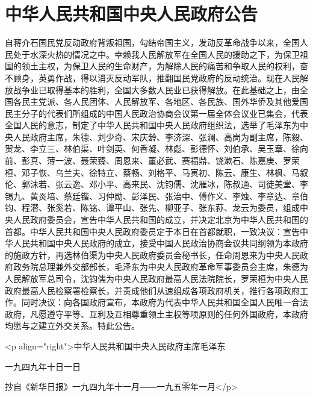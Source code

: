 \section[中华人民共和国中央人民政府公告（一九四九年十月一日）]{中华人民共和国中央人民政府公告}


自蒋介石国民党反动政府背叛祖国，勾结帝国主义，发动反革命战争以来，全国人民处于水深火热的情况之中。幸赖我人民解放军在全国人民的援助之下，为保卫祖国的领土主权，为保卫人民的生命财产，为解除人民的痛苦和争取人民的权利，奋不顾身，英勇作战，得以消灭反动军队，推翻国民党政府的反动统治。现在人民解放战争业已取得基本的胜利，全国大多数人民业已获得解放。在此基础之上，由全国各民主党派、各人民团体、人民解放军、各地区、各民族、国外华侨及其他爱国民主分子的代表们所组成的中国人民政治协商会议第一届全体会议业已集会，代表全国人民的意志，制定了中华人民共和国中央人民政府组织法，选举了毛泽东为中央人民政府主席，朱德、刘少奇、宋庆龄、李济深、张澜、高岗为副主席，陈毅、贺龙、李立三、林伯渠、叶剑英、何香凝、林彪、彭德怀、刘伯承、吴玉章、徐向前、彭真、薄一波、聂荣臻、周恩来、董必武、赛福鼎、饶漱石、陈嘉庚、罗荣桓、邓子恢、乌兰夫、徐特立、蔡畅、刘格平、马寅初、陈云、康生、林枫、马叙伦、郭沬若、张云逸、邓小平、高来民、沈钧儒、沈雁冰，陈叔通、司徒美堂、李锡九、黄炎培、蔡廷锴、习仲勋、彭泽民、张治中、傅作义、李烛、李章达、章伯钧、程潜、张奚若、陈铭、谭平山、张先、柳亚子、张东荪、龙云为委员，组成中央人民政府委员会，宣告中华人民共和国的成立，并决定北京为中华人民共和国的首都。中华人民共和国中央人民政府委员定于本日在首都就职，一致决议：宣告中华人民共和国中央人民政府的成立，接受中国人民政治协商会议共同纲领为本政府的施政方针，再选林伯渠为中央人民政府委员会秘书长，任命周恩来为中央人民政府政务院总理兼外交部部长，毛泽东为中央人民政府革命军事委员会主席，朱德为人民解放军总司令，沈钧儒为中央人民政府最高人民法院院长，罗荣桓为中央人民政府最高人民检察署检察长，并责成他们从速组成各项政府机关，推行各项政府工作。同时决议：向各国政府宣布，本政府为代表中华人民共和国全国人民唯一合法政府，凡愿遵守平等、互利及互相尊重领土主权等项原则的任何外国政府，本政府均愿与之建立外交关系。特此公告。

<p align="right">中华人民共和国中央人民政府主席毛泽东

一九四九年十日一日

抄自《新华日报》一九四九年十一月――一九五零年一月</p>


